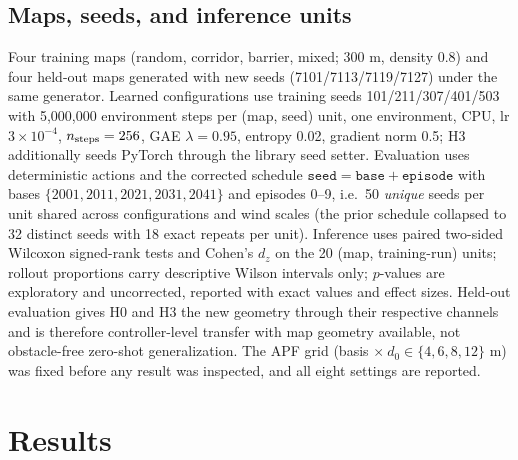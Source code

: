 \documentclass[conference]{IEEEtran}
\begin{document}
\subsection{Maps, seeds, and inference units}
Four training maps (random, corridor, barrier, mixed; 300 m, density 0.8) and four held-out maps generated with
new seeds (7101/7113/7119/7127) under the same generator. Learned configurations use training seeds
101/211/307/401/503 with 5,000,000 environment steps per (map, seed) unit, one environment, CPU, lr $3\times10^{-4}$,
$n_{\rm steps}=256$, GAE $\lambda=0.95$, entropy 0.02, gradient norm 0.5; H3 additionally seeds PyTorch through
the library seed setter. Evaluation uses deterministic actions and the corrected schedule
$\texttt{seed}=\texttt{base}+\texttt{episode}$ with bases $\{2001,2011,2021,2031,2041\}$ and episodes 0--9,
i.e.\ 50 \emph{unique} seeds per unit shared across configurations and wind scales (the prior schedule collapsed
to 32 distinct seeds with 18 exact repeats per unit). Inference uses paired two-sided Wilcoxon signed-rank tests
and Cohen's $d_z$ on the 20 (map, training-run) units; rollout proportions carry descriptive Wilson intervals
only; $p$-values are exploratory and uncorrected, reported with exact values and effect sizes. Held-out
evaluation gives H0 and H3 the new geometry through their respective channels and is therefore controller-level
transfer with map geometry available, not obstacle-free zero-shot generalization. The APF grid
(basis $\times\ d_0\in\{4,6,8,12\}$ m) was fixed before any result was inspected, and all eight settings are reported.

\section{Results}
\end{document}
